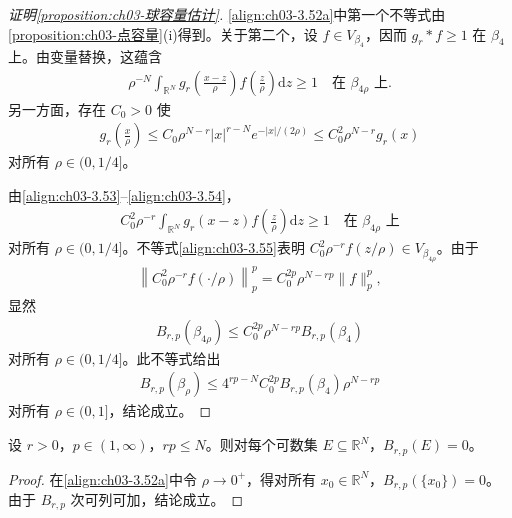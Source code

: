 \documentclass[../../main.tex]{subfiles}%
\begin{document}
\begin{proof}[证明\cref{proposition:ch03-球容量估计}]
\eqref{align:ch03-3.52a}中第一个不等式由\cref{proposition:ch03-点容量}(i)得到。关于第二个，设 $f\in V_{\beta_4}$，因而 $g_r*f\geqslant1$ 在 $\beta_4$ 上。由变量替换，这蕴含
\begin{align}
\rho^{-N}\int_{\mathbb{R}^N}g_r\left(\frac{x-z}{\rho}\right)f\left(\frac{z}{\rho}\right)\mathrm{d}z\geqslant1
\quad \text{在 }\beta_{4\rho}\text{ 上}.\label{align:ch03-3.53}
\end{align}
另一方面，存在 $C_0>0$ 使
\begin{align}
g_r\left(\frac{x}{\rho}\right)\leqslant C_0\rho^{N-r}|x|^{r-N}e^{-|x|/(2\rho)}
\leqslant C_0^2\rho^{N-r}g_r(x)\label{align:ch03-3.54}
\end{align}
对所有 $\rho\in(0,1/4]$。

由\eqref{align:ch03-3.53}--\eqref{align:ch03-3.54}，
\begin{align}
C_0^2\rho^{-r}\int_{\mathbb{R}^N}g_r(x-z)f\left(\frac{z}{\rho}\right)\mathrm{d}z\geqslant1
\quad \text{在 }\beta_{4\rho}\text{ 上}\label{align:ch03-3.55}
\end{align}
对所有 $\rho\in(0,1/4]$。不等式\eqref{align:ch03-3.55}表明 $C_0^2\rho^{-r}f(z/\rho)\in V_{\beta_{4\rho}}$。由于
\begin{align*}
\left\|C_0^2\rho^{-r}f(\cdot/\rho)\right\|_p^p
=C_0^{2p}\rho^{N-rp}\|f\|_p^p,
\end{align*}
显然
\begin{align*}
B_{r,p}(\beta_{4\rho})\leqslant C_0^{2p}\rho^{N-rp}B_{r,p}(\beta_4)
\end{align*}
对所有 $\rho\in(0,1/4]$。此不等式给出
\begin{align}
B_{r,p}(\beta_\rho)\leqslant 4^{rp-N}C_0^{2p}B_{r,p}(\beta_4)\rho^{N-rp}\label{align:ch03-3.56}
\end{align}
对所有 $\rho\in(0,1]$，结论成立。
\end{proof}

\begin{proposition}\label{proposition:ch03-单点容量}
设 $r>0$，$p\in(1,\infty)$，$rp\leqslant N$。则对每个可数集 $E\subseteq\mathbb{R}^N$，$B_{r,p}(E)=0$。
\end{proposition}

\begin{proof}
在\eqref{align:ch03-3.52a}中令 $\rho\to0^+$，得对所有 $x_0\in\mathbb{R}^N$，$B_{r,p}(\{x_0\})=0$。由于 $B_{r,p}$ 次可列可加，结论成立。
\end{proof}
\end{document}

